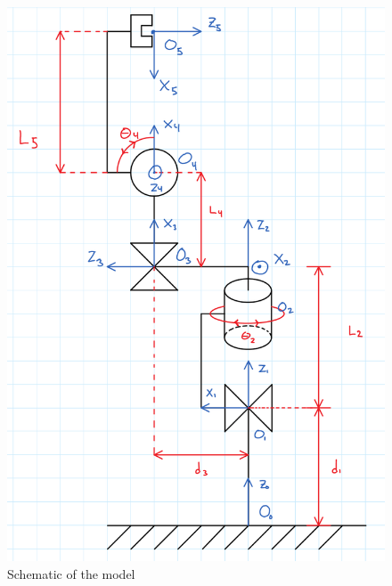 \documentclass[12pt, letterpaper]{amsart} %
\numberwithin{equation}{section}
\begin{document}
\begin{figure}[H]
  \centering
  \includegraphics[scale=0.4]{image4}
  \caption{Schematic of the model}
  \label{fig:1}
\end{figure}
\end{document}
